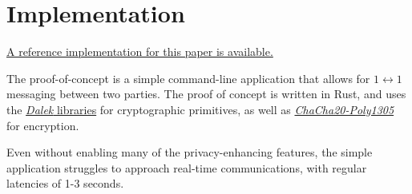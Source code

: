 \chapter{Implementation}\label{Implementation}

\href{https://github.com/encody/flexible-channels}{A reference implementation for this paper is available.}

The proof-of-concept is a simple command-line application that allows for $1 \leftrightarrow 1$ messaging between two parties. The proof of concept is written in Rust, and uses the \href{https://github.com/dalek-cryptography}{\emph{Dalek} libraries} for cryptographic primitives, as well as \href{https://github.com/RustCrypto/AEADs/tree/master/chacha20poly1305}{\emph{ChaCha20-Poly1305}} for encryption.

Even without enabling many of the privacy-enhancing features, the simple application struggles to approach real-time communications, with regular
latencies of 1-3 seconds.
